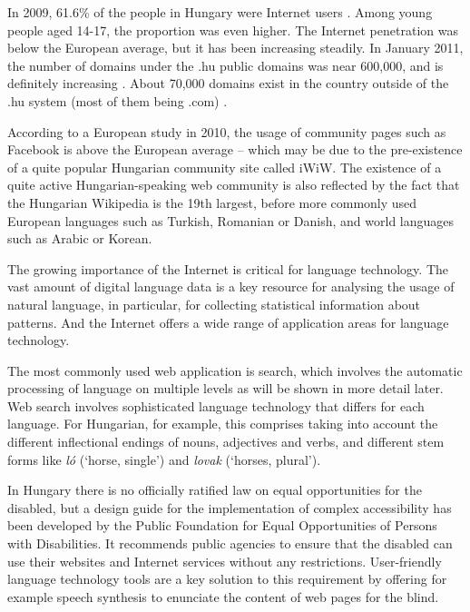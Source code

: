 \begin{multicols}{2}
In 2009, 61.6\% of the people in Hungary were Internet users \cite{internet}. Among young people aged 14-17, the proportion was even higher. The Internet penetration was below the European average, but it has been increasing steadily. In January 2011, the number of domains under the .hu public domains was near 600,000, and is definitely increasing \cite{domain}. About 70,000 domains exist in the country outside of the .hu system (most of them being .com) \cite{com}.


According to a European study in 2010, the usage of community pages such as Facebook is above the European average -- which may be due to the pre-existence of a quite popular Hungarian community site called iWiW. The existence of a quite active Hungarian-speaking web community is also reflected by the fact that the Hungarian Wikipedia is the 19th largest, before more commonly used European languages such as Turkish, Romanian or Danish, and world languages such as Arabic or Korean.

The growing importance of the Internet is critical for language technology. The vast amount of digital language data is a key resource for analysing the usage of natural language, in particular, for collecting statistical information about patterns. And the Internet offers a wide range of application areas for language technology. 

The most commonly used web application is search, which involves the automatic processing of language on multiple levels as will be shown in more detail later. Web search involves sophisticated language technology that differs for each language. For Hungarian, for example, this comprises taking into account the different inflectional endings of nouns, adjectives and verbs, and different stem forms like \textit{ló} (`horse, single') and \textit{lovak} (`horses, plural'). 

In Hungary there is no officially ratified law on equal opportunities for the disabled, but a design guide for the implementation of complex accessibility has been developed by the Public Foundation for Equal Opportunities of Persons with Disabilities. It recommends public agencies to ensure that the disabled can use their websites and Internet services without any restrictions. User-friendly language technology tools are a key solution to this requirement by offering for example speech synthesis to enunciate the content of web pages for the blind.


\end{multicols}
